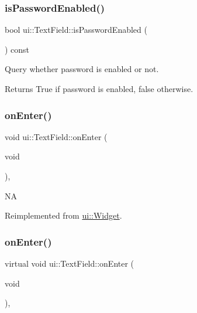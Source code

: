 \subsubsection{\texorpdfstring{is\+Password\+Enabled()}{isPasswordEnabled()}\hspace{0.1cm}{\footnotesize\ttfamily [2/2]}}
{\footnotesize\ttfamily bool ui\+::\+Text\+Field\+::is\+Password\+Enabled (\begin{DoxyParamCaption}{ }\end{DoxyParamCaption}) const}



Query whether password is enabled or not. 

\begin{DoxyReturn}{Returns}
True if password is enabled, false otherwise. 
\end{DoxyReturn}
\mbox{\label{classui_1_1TextField_ad7a8241c7d1a80bc8821e67044ffa20c}} 
\subsubsection{\texorpdfstring{on\+Enter()}{onEnter()}\hspace{0.1cm}{\footnotesize\ttfamily [1/2]}}
{\footnotesize\ttfamily void ui\+::\+Text\+Field\+::on\+Enter (\begin{DoxyParamCaption}\item[{void}]{ }\end{DoxyParamCaption})\hspace{0.3cm}{\ttfamily [override]}, {\ttfamily [virtual]}}

NA 

Reimplemented from \hyperlink{classui_1_1Widget_a9cda9b9ffbf77a8ed695e6b97b9a46cc}{ui\+::\+Widget}.

\mbox{\label{classui_1_1TextField_a8798bcf6c7f3540b7c078338386c04a3}} 
\subsubsection{\texorpdfstring{on\+Enter()}{onEnter()}\hspace{0.1cm}{\footnotesize\ttfamily [2/2]}}
{\footnotesize\ttfamily virtual void ui\+::\+Text\+Field\+::on\+Enter (\begin{DoxyParamCaption}\item[{void}]{ }\end{DoxyParamCaption})\hspace{0.3cm}{\ttfamily [override]}, {\ttfamily [virtual]}}

